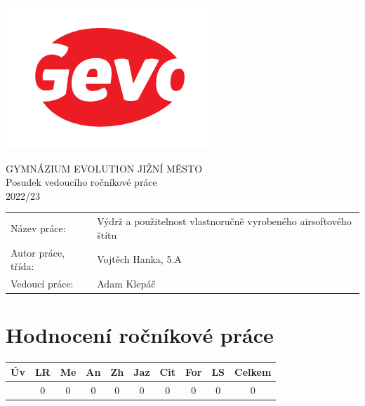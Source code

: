 \documentclass[a4paper,10pt]{article}
\begin{document}
\thispagestyle{fancy}
\begin{minipage}{.3\textwidth}
 \includegraphics[width=\textwidth]{logo}
\end{minipage}
\hfill
\begin{minipage}{.69\textwidth}
 \centering
 \Large{\sffamily
  GYMNÁZIUM EVOLUTION JIŽNÍ MĚSTO\\
  Posudek vedoucího ročníkové práce\\
  2022/23
 }
\end{minipage}

\begin{center}
 \large{
 \begin{tabular}{ll}
  \textsf{Název práce:} &
  \textsf{
   Výdrž a použitelnost vlastnoručně
vyrobeného airsoftového štítu
  }\\
  \textsf{Autor práce, třída:} &
  \textsf{
   Vojtěch Hanka, 5.A
  }\\
  \textsf{Vedoucí práce:} &
  \textsf{
   Adam Klepáč
  }
 \end{tabular}
 }
\end{center}

\section*{\sffamily \centering Hodnocení ročníkové práce}

\begin{center}
 \begin{tabular}{c|c|c|c|c|c|c|c|c|c}
  \sffamily
  Úv & LR & Me & An & Zh & Jaz & Cit & For & LS & Celkem\\
  \toprule
  \normalfont
  0
  &
  0
  &
  0
  &
  0
  &
  0
  &
  0
  &
  0
  &
  0
  &
  0
  &
  0
\end{tabular}
\end{center}
\end{document}
